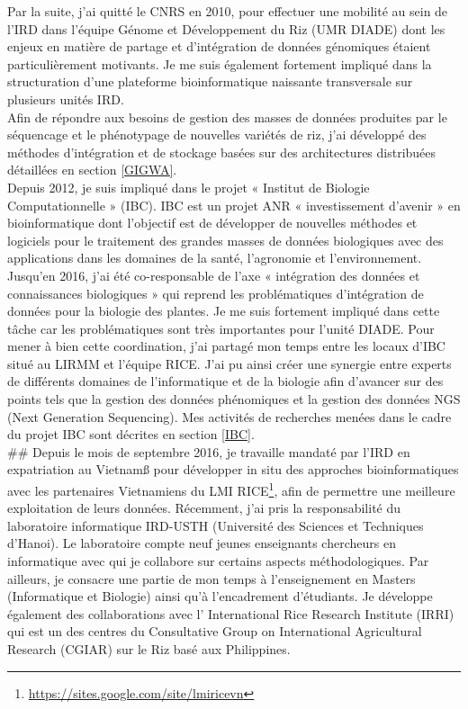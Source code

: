 Par la suite, j’ai quitté le CNRS en 2010, pour effectuer une mobilité au sein de l’IRD dans l’équipe Génome et Développement du Riz (UMR DIADE) dont les enjeux en matière de partage et d’intégration de données génomiques étaient particulièrement motivants. Je me suis également fortement impliqué dans la structuration d’une plateforme bioinformatique naissante transversale sur plusieurs unités IRD. \\
Afin de répondre aux besoins de gestion des masses de données produites par le séquencage et le phénotypage de nouvelles variétés de riz, j’ai développé des méthodes d’intégration et de stockage basées sur des architectures distribuées détaillées en section \ref{GIGWA}. \\
Depuis 2012, je suis impliqué dans le projet « Institut de Biologie Computationnelle » (IBC). IBC est un projet ANR « investissement d’avenir » en bioinformatique dont l’objectif est de développer de nouvelles méthodes et logiciels pour le traitement des grandes masses de données biologiques avec des applications dans les domaines de la santé, l’agronomie et l’environnement. 
Jusqu'en 2016, j'ai été co-responsable de l’axe « intégration des données et connaissances biologiques » qui reprend les problématiques d’intégration de données pour la biologie des plantes. Je me suis fortement impliqué dans cette tâche car les problématiques sont très importantes pour l’unité DIADE. Pour mener à bien cette coordination, j’ai partagé mon temps entre les locaux d’IBC situé au LIRMM et l’équipe RICE. J’ai pu ainsi créer une synergie entre experts de différents domaines de l’informatique et de la biologie afin d’avancer sur des points tels que la gestion des données phénomiques et la gestion des données NGS (Next Generation Sequencing). Mes activités de recherches menées dans le cadre du projet IBC sont décrites en section \ref{IBC}. \\
## Depuis le mois de septembre 2016, je travaille mandaté par l'IRD en expatriation au Vietnamß pour développer in situ des approches bioinformatiques avec les partenaires Vietnamiens du LMI RICE\footnote{\url{https://sites.google.com/site/lmiricevn}}, afin de permettre une meilleure exploitation de leurs données. Récemment, j’ai pris la responsabilité du laboratoire informatique IRD-USTH (Université des Sciences et Techniques d’Hanoi). Le laboratoire compte neuf jeunes enseignants chercheurs en informatique avec qui je collabore sur certains aspects méthodologiques. Par ailleurs, je consacre une partie de mon temps à l’enseignement en Masters (Informatique et Biologie) ainsi qu’à l’encadrement d’étudiants. Je développe également des collaborations avec l’ International Rice Research Institute (IRRI) qui est un des centres du Consultative Group on International Agricultural Research (CGIAR) sur le Riz basé aux Philippines.



